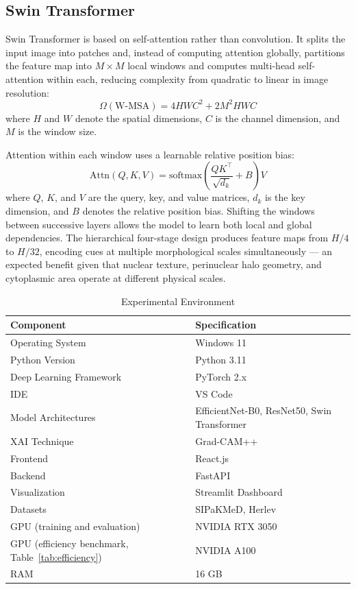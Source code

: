 \documentclass[runningheads]{llncs}
\begin{document}
\subsection{Swin Transformer}

Swin Transformer \cite{liu2021swin} is based on self-attention rather than convolution. It splits the input image into patches and, instead of computing attention globally, partitions the feature map into $M\times M$ local windows and computes multi-head self-attention within each, reducing complexity from quadratic to linear in image resolution:
\begin{equation}
    \Omega(\mathrm{W\text{-}MSA}) = 4HWC^2 + 2M^2HWC
    \label{eq:wmsa}
\end{equation}
where $H$ and $W$ denote the spatial dimensions, $C$ is the channel dimension, and $M$ is the window size.

Attention within each window uses a learnable relative position bias:
\begin{equation}
    \mathrm{Attn}(Q,K,V) = \mathrm{softmax}\!\left(\frac{QK^\top}{\sqrt{d_k}} + B\right)V
    \label{eq:attn}
\end{equation}
where $Q$, $K$, and $V$ are the query, key, and value matrices, $d_k$ is the key dimension, and $B$ denotes the relative position bias. Shifting the windows between successive layers allows the model to learn both local and global dependencies. The hierarchical four-stage design produces feature maps from $H/4$ to $H/32$, encoding cues at multiple morphological scales simultaneously --- an expected benefit given that nuclear texture, perinuclear halo geometry, and cytoplasmic area operate at different physical scales.

\begin{table}[ht]
\centering
\caption{Experimental Environment}
\label{tab:environment}
\begin{tabular}{|l|l|}
\hline
\textbf{Component} & \textbf{Specification} \\ \hline
Operating System & Windows 11 \\ \hline
Python Version & Python 3.11 \\ \hline
Deep Learning Framework & PyTorch 2.x \\ \hline
IDE & VS Code  \\ \hline
Model Architectures & EfficientNet-B0, ResNet50, Swin Transformer \\ \hline
XAI Technique & Grad-CAM++ \\ \hline
Frontend & React.js \\ \hline
Backend & FastAPI \\ \hline
Visualization & Streamlit Dashboard \\ \hline
Datasets & SIPaKMeD, Herlev \\ \hline
GPU (training and evaluation) & NVIDIA RTX 3050 \\ \hline
GPU (efficiency benchmark, Table~\ref{tab:efficiency}) & NVIDIA A100 \\ \hline
RAM & 16 GB \\ \hline
\end{tabular}
\end{table}
\end{document}
